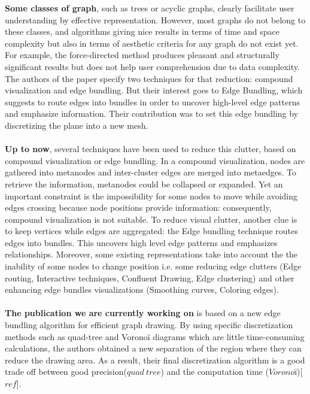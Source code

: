 \textbf{Some classes of graph}, such as trees or acyclic graphs, clearly facilitate user understanding by effective representation. However, most graphs do not belong to these classes, and algorithms giving nice results in terms of time and space complexity but also in terms of aesthetic criteria for any graph do not exist yet. For example, the force-directed method produces pleasant and structurally significant results but does not help user comprehension due to data complexity. The authors of the paper specify two techniques for that reduction: compound visualization and edge bundling. But their interest goes to Edge Bundling, which suggests to route edges into bundles in order to uncover high-level edge patterns and emphasize information. Their contribution was to set this edge bundling by discretizing the plane into a new mesh.
\\
\\
\textbf{Up to now}, several techniques have been used to reduce this clutter, based on compound visualization or edge bundling. In a compound visualization, nodes are gathered into metanodes and inter-cluster edges are merged into metaedges. To retrieve the information, metanodes could be collapsed or expanded. Yet an important constraint is the impossibility for some nodes to move while avoiding edges crossing because node positions provide information: consequently, compound visualization is not suitable. To reduce visual clutter, another clue is to keep vertices while edges are aggregated: the Edge bundling technique routes edges into bundles. This uncovers high level edge patterns and emphasizes relationships. Moreover, some existing representations take into account the the inability of some nodes to change position i.e.  some reducing edge clutters (Edge routing, Interactive techniques, Confluent Drawing, Edge clustering) and other enhancing edge bundles visualizations (Smoothing curves, Coloring edges). 
\\
\\
\textbf{The publication we are currently working on} is based on a new edge bundling algorithm for efficient graph drawing. By using specific  discretization methods such as quad-tree and Voronoï diagrams which are little time-consuming calculations, the authors obtained a new separation of the region where they can reduce the drawing area. As a result, their final discretization algorithm is a good trade off between good precision($quad~tree$) and the computation time ($Voronoï$)[$ref$].

